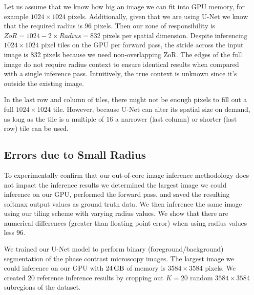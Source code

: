 \documentclass[runningheads]{llncs}
\begin{document}
Let us assume that we know how big an image we can fit into GPU memory, for example $1024 \times 1024$ pixels. Additionally, given that we are using U-Net we know that the required radius is 96 pixels. Then our zone of responsibility is $ZoR = 1024 - 2 \times Radius = 832$ pixels per spatial dimension. 
Despite inferencing $1024 \times 1024$ pixel tiles on the GPU per forward pass, the stride across the input image is 832 pixels because we need non-overlapping ZoR. 
The edges of the full image do not require radius context to ensure identical results when compared with a single inference pass. Intuitively, the true context is unknown since it's outside the existing image.


In the last row and column of tiles, there might not be enough pixels to fill out a full $1024 \times 1024$ tile. However, because U-Net can alter its spatial size on demand, as long as the tile is a multiple of 16 a narrower (last column) or shorter (last row) tile can be used. 


\subsection{Errors due to Small Radius}

To experimentally confirm that our out-of-core image inference methodology does not impact the inference results we determined the largest image we could inference on our GPU, performed the forward pass, and saved the resulting softmax output values as ground truth data. We then inference the same image using our tiling scheme with varying radius values. We show that there are numerical differences (greater than floating point error) when using radius values less 96. 

We trained our U-Net model to perform binary (foreground/background) segmentation of the phase contrast microscopy images. The largest image we could inference on our GPU with $\SI{24}{\giga\byte}$ of memory is $3584 \times 3584$ pixels. We created 20 reference inference results by cropping out $K = 20$ random $3584 \times 3584$ subregions of the dataset. 
\end{document}
